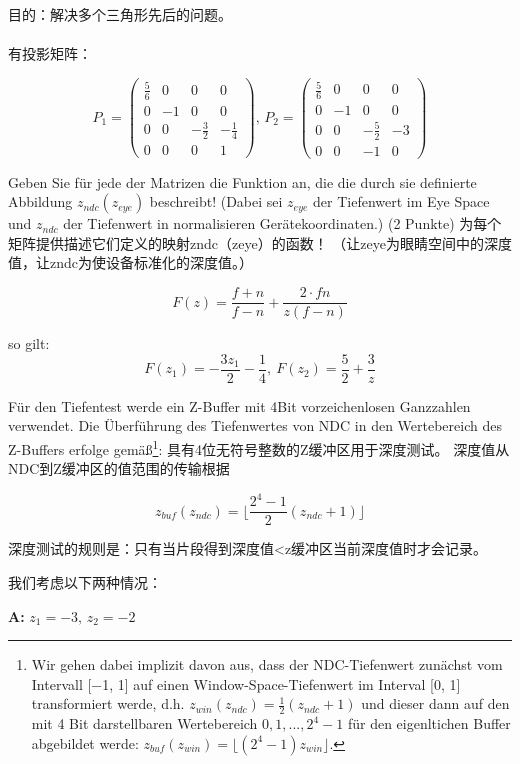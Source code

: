 \documentclass[fleqn]{article}
\begin{document}
\noindent 目的：解决多个三角形先后的问题。
\\
\\
\noindent 有投影矩阵：

$$P_1=\begin{pmatrix}
    \frac{5}{6}&0&0&0\\
    0&-1&0&0\\
    0&0&-\frac{3}{2}&-\frac{1}{4}\\
    0&0&0&1
\end{pmatrix},\,P_2=\begin{pmatrix}
    \frac{5}{6}&0&0&0\\
    0&-1&0&0\\
    0&0&-\frac{5}{2}&-3\\
    0&0&-1&0
\end{pmatrix}$$

Geben Sie für jede der Matrizen die Funktion an,
 die die durch sie definierte Abbildung $z_{ndc}(z_{eye})$ beschreibt! 
 (Dabei sei $z_{eye}$ der Tiefenwert im Eye Space und $z_{ndc}$ der Tiefenwert in 
 normalisieren Gerätekoordinaten.) (2 Punkte)
 为每个矩阵提供描述它们定义的映射zndc（zeye）的函数！ （让zeye为眼睛空间中的深度值，让zndc为使设备标准化的深度值。）


 $$F(z) = \frac{f+n}{f-n} + \frac{2\cdot fn}{z(f-n)}$$

 so gilt:
 $$F(z_1) = -\frac{3z_1}{2} - \frac{1}{4}, \ F(z_2) = \frac{5}{2}+\frac{3}{z}$$
 
 
 
Für den Tiefentest werde ein Z-Buffer mit 4Bit vorzeichenlosen Ganzzahlen verwendet. Die Überführung des Tiefenwertes von NDC in den Wertebereich des Z-Buffers erfolge gemäß\footnote{Wir gehen dabei implizit davon aus, dass der NDC-Tiefenwert zunächst vom Intervall [−1, 1] auf einen Window-Space-Tiefenwert im Interval [0, 1] transformiert werde, d.h. $z_{win}(z_{ndc}) = \frac{1}{2}(z_{ndc} +1)$ und dieser dann auf den mit 4 Bit darstellbaren Wertebereich $0, 1, . . . , 2^4 − 1$ für den eigenltichen Buffer abgebildet werde: $z_{buf}(z_{win}) = \lfloor(2^4 − 1)z_{win}\rfloor.$}:
具有4位无符号整数的Z缓冲区用于深度测试。 深度值从NDC到Z缓冲区的值范围的传输根据
 
$$z_{buf}(z_{ndc})=\lfloor\frac{2^4-1}{2}(z_{ndc}+1)\rfloor$$
 
 
深度测试的规则是：只有当片段得到深度值<z缓冲区当前深度值时才会记录。

我们考虑以下两种情况：

\textbf{A:} $z_1=-3,\,z_2=-2$
\end{document}
